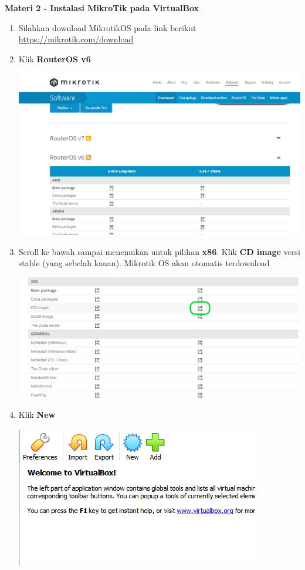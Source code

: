 \documentclass{article}
\begin{document}
	\newpage
    \begin{flushleft}
        \textbf{Materi 2 -  Instalasi MikroTik pada VirtualBox}
        \newline
		\begin{enumerate}
        	\item Silahkan download MikrotikOS pada link berikut \url{https://mikrotik.com/download}
			
			\item Klik \textbf{RouterOS v6} 
			
			\begin{center}
				\includegraphics[scale=0.3]{routerOS}
			\end{center}
			
			\item Scroll ke bawah sampai menemukan untuk pilihan \textbf{x86}. Klik \textbf{CD image} versi stable (yang sebelah kanan). Mikrotik OS akan otomatis terdownload
			\begin{center}
				\includegraphics[scale=0.3]{routerOS2}
			\end{center}		

        	\item Klik \textbf{New}
        		\begin{center}
        			\includegraphics[scale=0.6]{virtualbox}
        		\end{center}
        		

\end{enumerate}
\end{flushleft}
\end{document}
